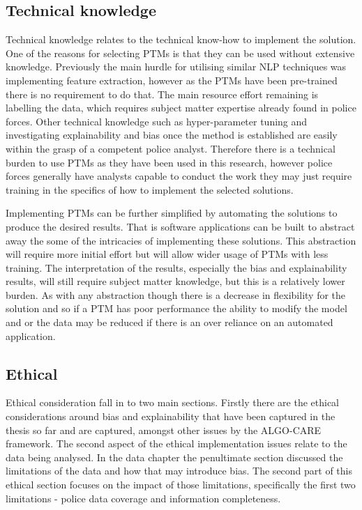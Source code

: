 \subsection{Technical knowledge} Technical knowledge relates to the technical know-how to implement the solution. One of the reasons for selecting PTMs is that they can be used without extensive knowledge. Previously the main hurdle for utilising similar NLP techniques was implementing feature extraction, however as the PTMs have been pre-trained there is no requirement to do that. The main  resource effort remaining is labelling the data, which requires subject matter expertise already found in police forces. Other technical knowledge such as hyper-parameter tuning and investigating explainability and bias  once the method is established are easily within the grasp of a competent police analyst. Therefore there is a technical burden to use PTMs as they have been used in this research, however police forces generally have analysts capable to conduct the work they may just require training in the specifics of how to implement the selected solutions.  

Implementing PTMs can be further simplified by automating the solutions to produce the desired results. That is software applications can be built to abstract away the some of the intricacies of implementing these solutions. This abstraction will require more initial effort but will allow wider usage of PTMs with less training. The interpretation of the results, especially the bias and explainability results,  will still require subject matter knowledge, but this is a relatively lower burden. As with any abstraction though there is a decrease in flexibility for the solution and so if a PTM has poor performance the ability to modify the model and or the data may be reduced if there is an over reliance on an automated application.  

\subsection{Ethical} Ethical consideration fall in to two main sections. Firstly there are the ethical considerations around bias and explainability that have been captured in the thesis so far and are captured, amongst other issues by the ALGO-CARE framework. The second aspect of the ethical implementation issues relate to the data being analysed. In the data chapter the penultimate section discussed the limitations of the data and how that may introduce bias. The second part of this ethical section focuses on the impact of those limitations, specifically the first two limitations - police data coverage and information completeness.

